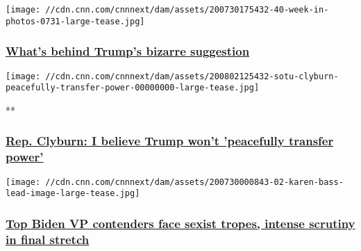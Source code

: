 \href{/2020/08/02/opinions/trump-bizarre-suggestion-opinion-column-galant/index.html}{}

\texttt{[image: //cdn.cnn.com/cnnnext/dam/assets/200730175432-40-week-in-photos-0731-large-tease.jpg]}

\hypertarget{whats-behind-trumps-bizarre-suggestion}{%
\subsubsection{\texorpdfstring{\href{/2020/08/02/opinions/trump-bizarre-suggestion-opinion-column-galant/index.html}{What's
behind Trump's bizarre
suggestion}}{What's behind Trump's bizarre suggestion}}\label{whats-behind-trumps-bizarre-suggestion}}

\href{/videos/politics/2020/08/02/sotu-clyburn-peacefully-transfer-power.cnn}{}

\texttt{[image: //cdn.cnn.com/cnnnext/dam/assets/200802125432-sotu-clyburn-peacefully-transfer-power-00000000-large-tease.jpg]}

**

\hypertarget{rep-clyburn-i-believe-trump-wont-peacefully-transfer-power}{%
\subsubsection{\texorpdfstring{\href{/videos/politics/2020/08/02/sotu-clyburn-peacefully-transfer-power.cnn}{Rep.
Clyburn: I believe Trump won't 'peacefully transfer
power'}}{Rep. Clyburn: I believe Trump won't 'peacefully transfer power'}}\label{rep-clyburn-i-believe-trump-wont-peacefully-transfer-power}}

\href{/2020/08/02/politics/joe-biden-vice-presidential-running-mate/index.html}{}

\texttt{[image: //cdn.cnn.com/cnnnext/dam/assets/200730000843-02-karen-bass-lead-image-large-tease.jpg]}

\hypertarget{top-biden-vp-contenders-face-sexist-tropes-intense-scrutiny-in-final-stretch}{%
\subsubsection{\texorpdfstring{\href{/2020/08/02/politics/joe-biden-vice-presidential-running-mate/index.html}{Top
Biden VP contenders face sexist tropes, intense scrutiny in final
stretch}}{Top Biden VP contenders face sexist tropes, intense scrutiny in final stretch}}\label{top-biden-vp-contenders-face-sexist-tropes-intense-scrutiny-in-final-stretch}}

